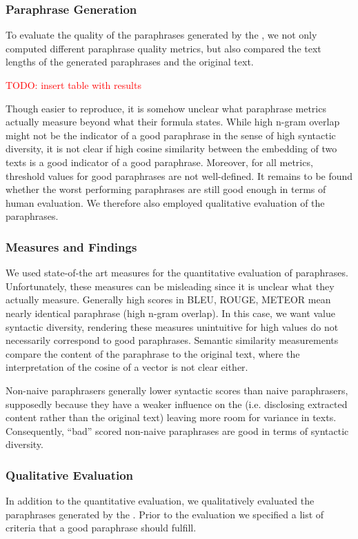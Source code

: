 \subsubsection{Paraphrase Generation}
\label{subsec:paraphrase_generation}
To evaluate the quality of the paraphrases generated by the \pgenerator{}, 
we not only computed different paraphrase quality metrics, 
but also compared the text lengths of the generated paraphrases and the original text.

\textcolor{red}{TODO: insert table with results}

Though easier to reproduce, it is somehow unclear what paraphrase metrics actually measure beyond what their formula states.
While high n-gram overlap might not be the indicator of a good paraphrase in the sense of high syntactic diversity, 
it is not clear if high cosine similarity between the embedding of two texts is a good indicator of a good paraphrase.
Moreover, for all metrics, threshold values for good paraphrases are not well-defined.
It remains to be found whether the worst performing paraphrases are still good enough in terms of human evaluation.
We therefore also employed qualitative evaluation of the paraphrases.

\subsubsection{Measures and Findings}
\label{subsec:measures_and_findings}

We used state-of-the art measures for the quantitative evaluation of paraphrases. 
Unfortunately, these measures can be misleading since it is unclear what they actually measure.
Generally high scores in BLEU, ROUGE, METEOR mean nearly identical paraphrase (high n-gram overlap).
In this case, we want value syntactic diversity, rendering these measures unintuitive 
for high values do not necessarily correspond to good paraphrases.
Semantic similarity measurements compare the content of the paraphrase to the original text, 
where the interpretation of the cosine of a vector is not clear either.

Non-naive paraphrasers generally lower syntactic scores than naive paraphrasers,
supposedly because they have a weaker influence on the \pgenerator{} 
(i.e. disclosing extracted content rather than the original text)
leaving more room for variance in texts.
Consequently, \enquote{bad} scored non-naive paraphrases are good in terms of syntactic diversity.

\subsubsection{Qualitative Evaluation}
\label{subsec:qualitative_evaluation}

In addition to the quantitative evaluation, we qualitatively evaluated the paraphrases generated by the \pgenerator{}.
Prior to the evaluation we specified a list of criteria that a good paraphrase should fulfill.

